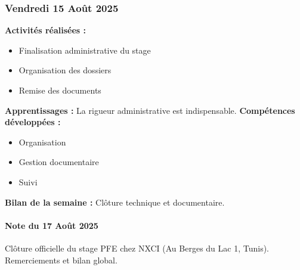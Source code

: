 \documentclass[12pt,a4paper]{article}
\begin{document}
\subsubsection{Vendredi 15 Août 2025}
\textbf{Activités réalisées :}
\begin{itemize}
    \item Finalisation administrative du stage
    \item Organisation des dossiers
    \item Remise des documents
\end{itemize}
\textbf{Apprentissages :} La rigueur administrative est indispensable.
\textbf{Compétences développées :}
\begin{itemize}
    \item Organisation
    \item Gestion documentaire
    \item Suivi
\end{itemize}
\textbf{Bilan de la semaine :} Clôture technique et documentaire.

\paragraph{Note du 17 Août 2025} Clôture officielle du stage PFE chez NXCI (Au Berges du Lac 1, Tunis). Remerciements et bilan global.
\end{document}
